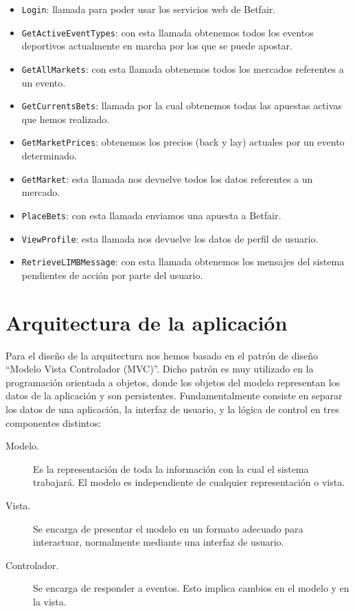 \begin{itemize}
	\item \lstinline{Login}: 
		llamada para poder usar los servicios web de Betfair. 
	\item \lstinline{GetActiveEventTypes}: 
		con esta llamada obtenemos todos los eventos deportivos actualmente en marcha por los que se puede apostar.
	\item  \lstinline{GetAllMarkets}:
		con esta llamada obtenemos todos los mercados referentes a un evento.
	\item  \lstinline{GetCurrentsBets}:
		llamada por la cual obtenemos todas las apuestas activas que hemos realizado.
	\item  \lstinline{GetMarketPrices}:
		obtenemos los precios (back y lay) actuales por un evento determinado.
	\item  \lstinline{GetMarket}:
		esta llamada nos devuelve todos los datos referentes a un mercado.
	\item  \lstinline{PlaceBets}:
		con esta llamada enviamos una apuesta a Betfair.
	\item  \lstinline{ViewProfile}: 
		esta llamada nos devuelve los datos de perfil de usuario.
	\item  \lstinline{RetrieveLIMBMessage}:
		 con esta llamada obtenemos los mensajes del sistema pendientes de acción por parte del usuario.
\end{itemize}

\section{Arquitectura de la aplicación}

 Para el diseño de la arquitectura nos hemos basado en el patrón de diseño ``Modelo Vista Controlador (MVC)''. Dicho patrón es muy utilizado en la programación orientada a objetos, donde los objetos del modelo representan los datos de la aplicación y son persistentes. Fundamentalmente consiste en separar los datos de una aplicación, la interfaz de usuario, y la lógica de control en tres componentes distintos:
 
 
 \begin{description}
 	\item [Modelo.] Es la representación de toda la información con la cual el sistema trabajará. El modelo es independiente de cualquier representación o vista.
	\item [Vista.] Se encarga de presentar el modelo en un formato adecuado para interactuar, normalmente mediante una interfaz de usuario.
	\item [Controlador.] Se encarga de responder a eventos. Esto implica cambios en el modelo y en la vista.
\end{description}
 
